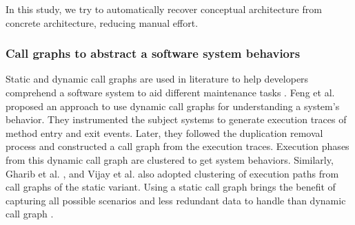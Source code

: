 In this study, we try to automatically recover conceptual architecture from concrete architecture, reducing manual effort.

\subsubsection{Call graphs to abstract a software system behaviors}

Static and dynamic call graphs are used in literature to help developers comprehend a software system to aid different maintenance tasks \cite{feng2018hierarchicalExecutionComprehension, gharibi2018automaticStaticCluster, xin2019identifyingFeaturesExecution}. Feng et al. \cite{feng2018hierarchicalExecutionComprehension} proposed an approach to use dynamic call graphs for understanding a system's behavior. They instrumented the subject systems to generate execution traces of method entry and exit events. Later, they followed the duplication removal process and constructed a call graph from the execution traces. Execution phases from this dynamic call graph are clustered to get system behaviors. Similarly, Gharib et al. \cite{gharibi2018automaticStaticCluster}, and Vijay et al. \cite{walunj2019graphevoEvolutionCall} also adopted clustering of execution paths from call graphs of the static variant. Using a static call graph brings the benefit of capturing all possible scenarios and less redundant data to handle than dynamic call graph \cite{gharibi2018automaticStaticCluster}. 

